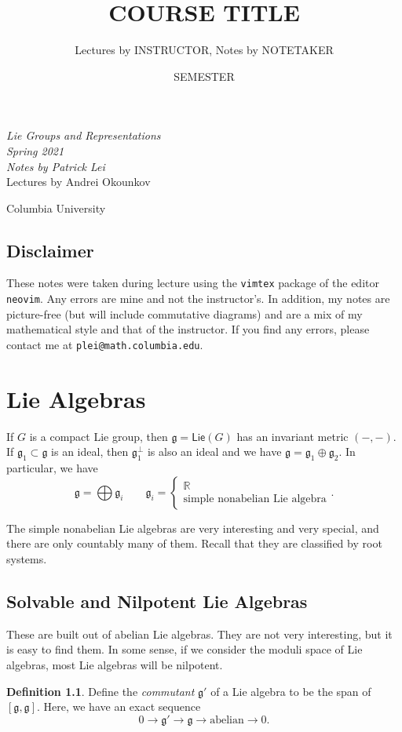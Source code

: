 \documentclass[leqno, openany]{memoir}
\title{COURSE TITLE}
\author{Lectures by INSTRUCTOR, Notes by NOTETAKER}
\date{SEMESTER}
\theoremstyle{definition}
\newtheorem{defn}[thm]{Definition}
\theoremstyle{remark}
\theoremstyle{plain}
\theoremstyle{definition}
\theoremstyle{remark}
\newcommand{\R}{\mathbb{R}}
\newcommand{\mf}[1]{\mathfrak{#1}}
\newcommand{\ms}[1]{\mathsf{#1}}
\newcommand*{\titleSW}
    {\begingroup%
    \raggedleft
    \vspace*{\baselineskip}
    {\Huge\itshape Lie Groups and Representations \\ Spring 2021}\\[\baselineskip]
    {\large\itshape Notes by Patrick Lei}\\[0.2\textheight]
    {\Large Lectures by Andrei Okounkov}\par
    \vfill
    {\Large \sffamily Columbia University}
    \vspace*{\baselineskip}
\endgroup}
\begin{document}
    
\begin{titlingpage}
\titleSW
\end{titlingpage}

\thispagestyle{empty}
\section*{Disclaimer}%
\label{sec:disclaimer}

These notes were taken during lecture using the \texttt{vimtex} package of the editor \texttt{neovim}. 
Any errors are mine and not the instructor's. 
In addition, my notes are picture-free (but will include commutative diagrams) and are a mix of my mathematical style and that of the instructor.
If you find any errors, please contact me at \texttt{plei@math.columbia.edu}.
\newpage

\tableofcontents

\chapter{Lie Algebras}%
\label{cha:semisimple_lie_algebras}

If $G$ is a compact Lie group, then $\mf{g} = \ms{Lie}(G)$ has an invariant metric $(-,-)$. If $\mf{g}_1 \subset \mf{g}$ is an ideal, then $\mf{g}_1^{\perp}$ is also an ideal and we have $\mf{g} = \mf{g}_1 \oplus \mf{g}_2$. In particular, we have 
\[ \mf{g} = \bigoplus \mf{g}_i \qquad \mf{g}_i = \begin{cases}
    \R \\
    \text{simple nonabelian Lie algebra}
\end{cases}. \]

The simple nonabelian Lie algebras are very interesting and very special, and there are only countably many of them. Recall that they are classified by root systems. 

\section{Solvable and Nilpotent Lie Algebras}%
\label{sec:solvable_and_nilpotent_lie_algebras}

These are built out of abelian Lie algebras. They are not very interesting, but it is easy to find them. In some sense, if we consider the moduli space of Lie algebras, most Lie algebras will be nilpotent.

\begin{defn}
    Define the \textit{commutant} $\mf{g}'$ of a Lie algebra to be the span of $[\mf{g}, \mf{g}]$. Here, we have an exact sequence
    \[ 0 \to \mf{g}' \to \mf{g} \to \text{abelian} \to 0. \]
\end{defn}
\end{document}
